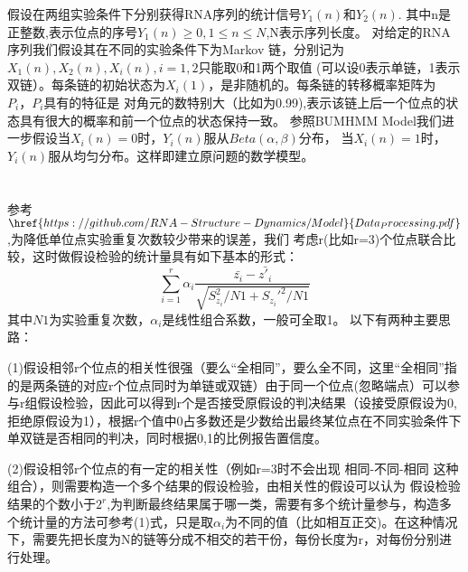 \documentclass[12pt]{article}
\begin{document}
\title{\textbf{}} 

\author{}
\maketitle
\large
\section{\textbf{}}
假设在两组实验条件下分别获得RNA序列的统计信号$Y_1(n)$和$Y_2(n)$.
其中n是正整数,表示位点的序号$Y_1(n) \ge 0,1\le n \le N$,N表示序列长度。
对给定的RNA序列我们假设其在不同的实验条件下为Markov 链，分别记为$X_1(n),X_2(n),X_i(n),i=1,2$只能取0和1两个取值
(可以设0表示单链，1表示双链）。每条链的初始状态为$X_i(1)$，是非随机的。每条链的转移概率矩阵为$P_i，P_i$具有的特征是
对角元的数特别大（比如为0.99),表示该链上后一个位点的状态具有很大的概率和前一个位点的状态保持一致。
参照BUMHMM Model我们进一步假设当$X_i(n)=0$时，$Y_i(n)$服从$Beta(\alpha,\beta)$分布，
当$X_i(n)=1$时，$Y_i(n)$服从均匀分布。这样即建立原问题的数学模型。
\section{\textbf{}}
参考 $\href{https://github.com/RNA-Structure-Dynamics/Model}{Data_Processing.pdf}$,为降低单位点实验重复次数较少带来的误差，我们
考虑r(比如r=3)个位点联合比较，这时做假设检验的统计量具有如下基本的形式：
\begin{equation}
\sum_{i=1}^r \alpha_i \frac{\bar{z_i}-\bar{z'_i}}{\sqrt{S_{z_i}^2/N1+S_{z_i}'^2/N1}}
\end{equation}
其中$N1$为实验重复次数，$\alpha_i$是线性组合系数，一般可全取1。
以下有两种主要思路：

(1)假设相邻r个位点的相关性很强（要么“全相同”，要么全不同，这里“全相同”指的是两条链的对应r个位点同时为单链或双链）由于同一个位点(忽略端点）可以参与r组假设检验，因此可以得到r个是否接受原假设的判决结果（设接受原假设为0,拒绝原假设为1），根据r个值中0占多数还是少数给出最终某位点在不同实验条件下单双链是否相同的判决，同时根据0,1的比例报告置信度。

(2)假设相邻r个位点的有一定的相关性（例如r=3时不会出现 相同-不同-相同 这种组合），则需要构造一个多个结果的假设检验，由相关性的假设可以认为
假设检验结果的个数小于$2^r$,为判断最终结果属于哪一类，需要有多个统计量参与，构造多个统计量的方法可参考(1)式，只是取$\alpha_i$为不同的值（比如相互正交)。在这种情况下，需要先把长度为N的链等分成不相交的若干份，每份长度为r，对每份分别进行处理。
\end{document}
